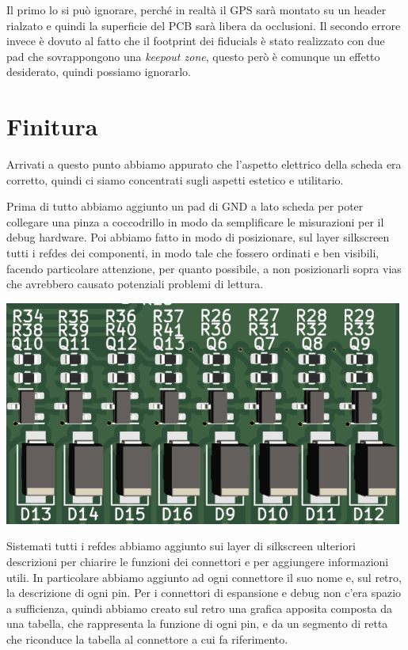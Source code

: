 Il primo lo si può ignorare, perché in realtà il GPS sarà montato su un
header rialzato e quindi la superficie del PCB sarà libera da
occlusioni. Il secondo errore invece è dovuto al fatto che il footprint
dei fiducials è stato realizzato con due pad che sovrappongono una
\emph{keepout zone}, questo però è comunque un effetto desiderato,
quindi possiamo ignorarlo.

\hypertarget{finitura}{%
\section{Finitura}\label{finitura}}

Arrivati a questo punto abbiamo appurato che l'aspetto elettrico della
scheda era corretto, quindi ci siamo concentrati sugli aspetti estetico
e utilitario.

Prima di tutto abbiamo aggiunto un pad di GND a lato scheda per poter
collegare una pinza a coccodrillo in modo da semplificare le misurazioni
per il debug hardware. Poi abbiamo fatto in modo di posizionare, sul
layer silkscreen tutti i refdes dei componenti, in modo tale che fossero
ordinati e ben visibili, facendo particolare attenzione, per quanto
possibile, a non posizionarli sopra vias che avrebbero causato
potenziali problemi di lettura.

\begin{center}
\includegraphics[scale=1]{figures/image100.png}
\captionsetup{type=figure}
\end{center}

Sistemati tutti i refdes abbiamo aggiunto sui layer di silkscreen
ulteriori descrizioni per chiarire le funzioni dei connettori e per
aggiungere informazioni utili. In particolare abbiamo aggiunto ad ogni
connettore il suo nome e, sul retro, la descrizione di ogni pin. Per i
connettori di espansione e debug non c'era spazio a sufficienza, quindi
abbiamo creato sul retro una grafica apposita composta da una tabella,
che rappresenta la funzione di ogni pin, e da un segmento di retta che
riconduce la tabella al connettore a cui fa riferimento.

